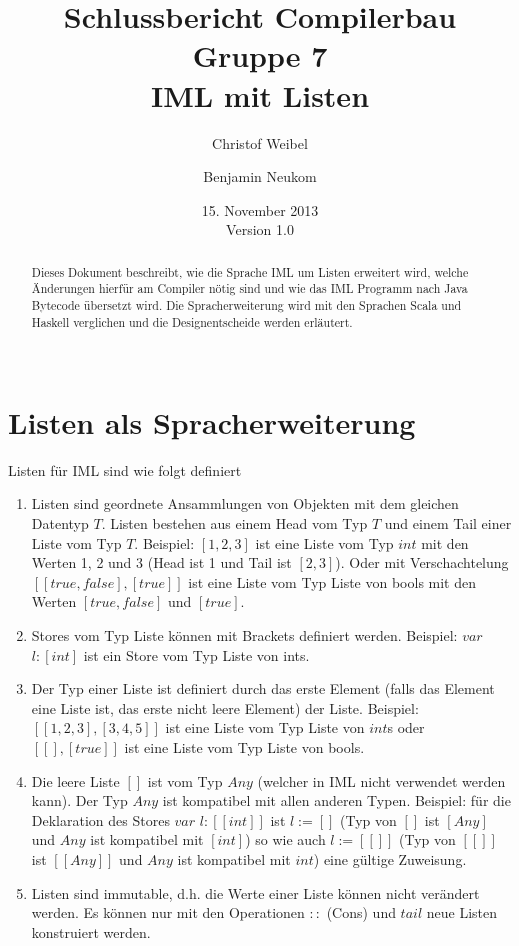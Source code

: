 \documentclass[a4paper,notitlepage,oneside]{article}
\title{Schlussbericht Compilerbau \\ Gruppe 7 \\ IML mit Listen}
\author{Christof Weibel \and Benjamin Neukom\\}
\date{15. November 2013\\ Version 1.0\\}
\begin{document}
\maketitle

\begin{abstract}
Dieses  Dokument beschreibt, wie die Sprache IML um Listen erweitert wird, welche Änderungen hierfür am Compiler nötig sind und wie das IML Programm nach Java Bytecode übersetzt wird. Die Spracherweiterung wird mit den Sprachen Scala und Haskell verglichen und die Designentscheide werden erläutert.  \\ \\
\end{abstract}

\section{Listen als Spracherweiterung}

Listen für IML sind wie folgt definiert

\begin{enumerate}

  \item Listen sind geordnete Ansammlungen von Objekten mit dem gleichen Datentyp $T$. Listen bestehen aus einem Head vom Typ $T$ und einem Tail einer Liste vom Typ $T$. Beispiel: $[1,2,3]$ ist eine Liste vom Typ $int$ mit den Werten 1, 2 und 3 (Head ist 1 und Tail ist $[2, 3]$). Oder mit Verschachtelung $[[true, false], [true]]$ ist eine Liste vom Typ Liste von bools mit den Werten $[true,false]$ und $[true]$.

  \item Stores vom Typ Liste können mit Brackets definiert werden. Beispiel: $var$ $l:[int]$ ist ein Store vom Typ Liste von ints.
    
  \item Der Typ einer Liste ist definiert durch das erste Element (falls das Element eine Liste ist, das erste nicht leere Element) der Liste. Beispiel:  $[[1,2,3],[3,4,5]]$ ist eine Liste vom Typ Liste von $int$s oder $[[], [true]]$ ist eine Liste vom Typ Liste von bools.

  \item Die leere Liste $[]$ ist vom Typ $Any$ (welcher in IML nicht verwendet werden kann). Der Typ $Any$ ist kompatibel mit allen anderen Typen. Beispiel: für die Deklaration des Stores $var$ $l:[[int]]$ ist $l := []$ (Typ von $[]$ ist $[Any]$ und $Any$ ist kompatibel mit $[int]$) so wie auch $l := [[]]$ (Typ von $[[]]$ ist $[[Any]]$ und $Any$ ist kompatibel mit $int$) eine gültige Zuweisung.

  \item Listen sind immutable, d.h. die Werte einer Liste können nicht verändert werden. Es können nur mit den Operationen $::$ (Cons) und $tail$ neue Listen konstruiert werden.
\end{enumerate} 
\end{document}
